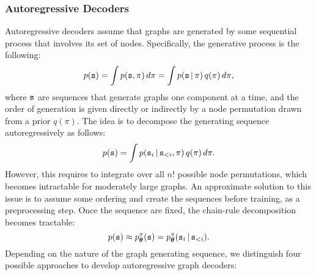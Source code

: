 \subsubsection*{Autoregressive Decoders}
Autoregressive decoders assume that graphs are generated by some sequential process that involves its set of nodes. Specifically, the generative process is the following:
$$p(\mathtt{s}) = \int p(\mathtt{s}, \pi)\, d\pi = \int p(\mathtt{s} \,|\, \pi)\, q(\pi)\, d\pi,$$
where $\mathtt{s}$ are sequences that generate graphs one component at a time, and the order of generation is given directly or indirectly by a node permutation drawn from a prior $q(\pi)$. The idea is to decompose the generating sequence autoregressively as follows:
$$p(\mathtt{s}) = \int p(\mathtt{s}_i \,|\, \mathtt{s}_{<i}, \pi)\, q(\pi)\, d\pi.$$
However, this requires to integrate over all $n!$ possible node permutations, which becomes intractable for moderately large graphs. An approximate solution to this issue is to assume some ordering and create the sequences before training, as a preprocessing step. Once the sequence are fixed, the chain-rule decomposition becomes tractable:
$$p(\mathtt{s}) \approx p_{\boldsymbol{\theta}}^{\pi}(\mathtt{s}) = p_{\boldsymbol{\theta}}^{\pi}(\mathtt{s}_i \,|\, \mathtt{s}_{<i}).$$
Depending on the nature of the graph generating sequence, we distinguish four possible approaches to develop autoregressive graph decoders:
